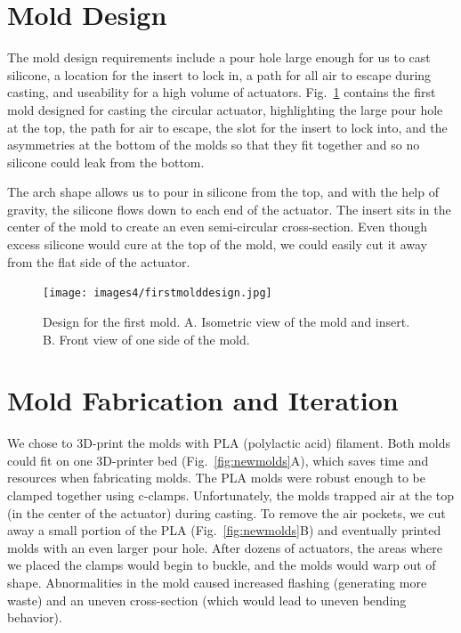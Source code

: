 \section{Mold Design}

The mold design requirements include a pour hole large enough for us to cast silicone, a location for the insert to lock in, a path for all air to escape during casting, and useability for a high volume of actuators. Fig.~\ref{fig:firstmold} contains the first mold designed for casting the circular actuator, highlighting the large pour hole at the top, the path for air to escape, the slot for the insert to lock into, and the asymmetries at the bottom of the molds so that they fit together and so no silicone could leak from the bottom. 

The arch shape allows us to pour in silicone from the top, and with the help of gravity, the silicone flows down to each end of the actuator. The insert sits in the center of the mold to create an even semi-circular cross-section. Even though excess silicone would cure at the top of the mold, we could easily cut it away from the flat side of the actuator. 

\begin{figure}[!ht]
    \centering
    \texttt{[image: images4/firstmolddesign.jpg]}
    \caption{Design for the first mold. A. Isometric view of the mold and insert. B. Front view of one side of the mold.}
    \label{fig:firstmold}
\end{figure}

\section{Mold Fabrication and Iteration}

We chose to 3D-print the molds with PLA (polylactic acid) filament. Both molds could fit on one 3D-printer bed (Fig.~\ref{fig:newmolds}A), which saves time and resources when fabricating molds. The PLA molds were robust enough to be clamped together using c-clamps. Unfortunately, the molds trapped air at the top (in the center of the actuator) during casting. To remove the air pockets, we cut away a small portion of the PLA (Fig.~\ref{fig:newmolds}B) and eventually printed molds with an even larger pour hole. After dozens of actuators, the areas where we placed the clamps would begin to buckle, and the molds would warp out of shape. Abnormalities in the mold caused increased flashing (generating more waste) and an uneven cross-section (which would lead to uneven bending behavior). 

